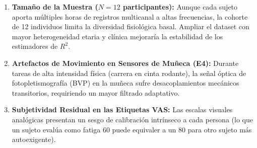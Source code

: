 \begin{enumerate}
    \item \textbf{Tamaño de la Muestra ($N=12$ participantes):} Aunque cada sujeto aporta múltiples horas de registros multicanal a altas frecuencias, la cohorte de 12 individuos limita la diversidad fisiológica basal. Ampliar el dataset con mayor heterogeneidad etaria y clínica mejoraría la estabilidad de los estimadores de $R^2$.
    \item \textbf{Artefactos de Movimiento en Sensores de Muñeca (E4):} Durante tareas de alta intensidad física (carrera en cinta rodante), la señal óptica de fotopletismografía (BVP) en la muñeca sufre desacoplamientos mecánicos transitorios, requiriendo un mayor filtrado adaptativo.
    \item \textbf{Subjetividad Residual en las Etiquetas VAS:} Las escalas visuales analógicas presentan un sesgo de calibración intrínseco a cada persona (lo que un sujeto evalúa como fatiga 60 puede equivaler a un 80 para otro sujeto más autoexigente).
\end{enumerate}
